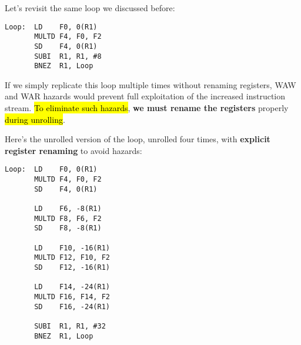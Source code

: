 \highspace
Let's revisit the same loop we discussed before:
\begin{lstlisting}[language=unknown]
Loop:  LD    F0, 0(R1)
       MULTD F4, F0, F2
       SD    F4, 0(R1)
       SUBI  R1, R1, #8
       BNEZ  R1, Loop
\end{lstlisting}
If we simply replicate this loop multiple times without renaming registers, WAW and WAR hazards would prevent full exploitation of the increased instruction stream. \hl{To eliminate such hazards}, \textbf{we must rename the registers} properly \hl{during unrolling}.

\newpage

\noindent
Here's the unrolled version of the loop, unrolled four times, with \textbf{explicit register renaming} to avoid hazards:
\begin{lstlisting}[language=unknown]
Loop:  LD    F0, 0(R1)
       MULTD F4, F0, F2
       SD    F4, 0(R1)

       LD    F6, -8(R1)
       MULTD F8, F6, F2
       SD    F8, -8(R1)

       LD    F10, -16(R1)
       MULTD F12, F10, F2
       SD    F12, -16(R1)

       LD    F14, -24(R1)
       MULTD F16, F14, F2
       SD    F16, -24(R1)

       SUBI  R1, R1, #32
       BNEZ  R1, Loop
\end{lstlisting}
